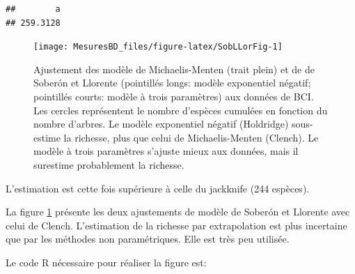 \documentclass[
  11pt,
  french,
  a4paper,
  extrafontsizes,onecolumn,openright
  ]{memoir}
\begin{document}
\begin{verbatim}
##        a 
## 259.3128
\end{verbatim}

\normalsize



\scriptsize

\begin{figure}

{\centering \texttt{[image: MesuresBD\_files/figure-latex/SobLLorFig-1]} 

}

\caption{Ajustement des modèle de Michaelis-Menten (trait plein) et de de Soberón et Llorente (pointillés longs: modèle exponentiel négatif; pointillés courts: modèle à trois paramètres) aux données de BCI. Les cercles représentent le nombre d'espèces cumulées en fonction du nombre d'arbres. Le modèle exponentiel négatif (Holdridge) sous-estime la richesse, plus que celui de Michaelis-Menten (Clench). Le modèle à trois paramètres s'ajuste mieux aux données, mais il surestime probablement la richesse.}\label{fig:SobLLorFig}
\end{figure}

\normalsize

L'estimation est cette fois supérieure à celle du jackknife (244 espèces).

La figure \ref{fig:SobLLorFig} présente les deux ajustements de modèle de Soberón et Llorente avec celui de Clench.
L'estimation de la richesse par extrapolation est plus incertaine que par les méthodes non paramétriques.
Elle est très peu utilisée.

Le code R nécessaire pour réaliser la figure est:

\scriptsize
\end{document}
